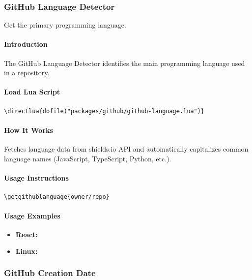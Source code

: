 \documentclass{article}
\begin{document}
\subsubsection{GitHub Language Detector}

Get the primary programming language.

\paragraph{Introduction}

The GitHub Language Detector identifies the main programming language used in a repository.

\paragraph{Load Lua Script}

\begin{verbatim}
\directlua{dofile("packages/github/github-language.lua")}
\end{verbatim}

\paragraph{How It Works}

Fetches language data from shields.io API and automatically capitalizes common language names (JavaScript, TypeScript, Python, etc.).

\paragraph{Usage Instructions}

\begin{verbatim}
\getgithublanguage{owner/repo}
\end{verbatim}

\paragraph{Usage Examples}

\begin{itemize}
    \item \textbf{React:} 
    \item \textbf{Linux:} 
\end{itemize}

\subsubsection{GitHub Creation Date}
\end{document}
